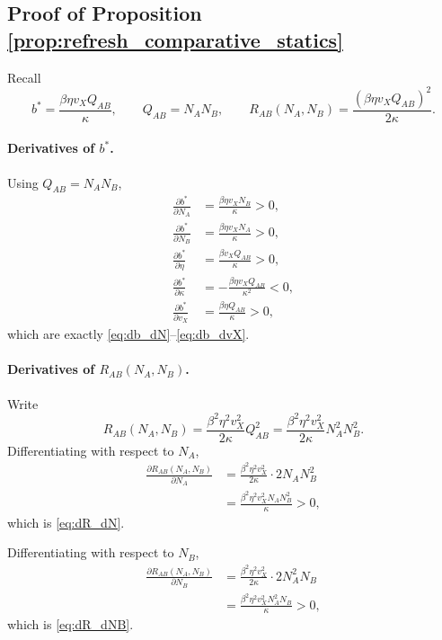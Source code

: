 \subsection{Proof of Proposition \ref{prop:refresh_comparative_statics}}

Recall
\[
b^*=\frac{\beta\eta v_XQ_{AB}}{\kappa},
\qquad
Q_{AB}=N_AN_B,
\qquad
R_{AB}(N_A,N_B)=\frac{(\beta\eta v_XQ_{AB})^2}{2\kappa}.
\]

\paragraph{Derivatives of $b^*$.}
Using $Q_{AB}=N_AN_B$,
\begin{align}
\frac{\partial b^*}{\partial N_A}
&=
\frac{\beta\eta v_XN_B}{\kappa}
>0,
\label{eq:app6_db_dNA}
\\[0.4em]
\frac{\partial b^*}{\partial N_B}
&=
\frac{\beta\eta v_XN_A}{\kappa}
>0,
\label{eq:app6_db_dNB}
\\[0.4em]
\frac{\partial b^*}{\partial \eta}
&=
\frac{\beta v_XQ_{AB}}{\kappa}
>0,
\label{eq:app6_db_deta}
\\[0.4em]
\frac{\partial b^*}{\partial \kappa}
&=
-\frac{\beta\eta v_XQ_{AB}}{\kappa^2}
<0,
\label{eq:app6_db_dkappa}
\\[0.4em]
\frac{\partial b^*}{\partial v_X}
&=
\frac{\beta\eta Q_{AB}}{\kappa}
>0,
\label{eq:app6_db_dvX}
\end{align}
which are exactly \eqref{eq:db_dN}--\eqref{eq:db_dvX}.

\paragraph{Derivatives of $R_{AB}(N_A,N_B)$.}
Write
\[
R_{AB}(N_A,N_B)
=
\frac{\beta^2\eta^2v_X^2}{2\kappa}Q_{AB}^2
=
\frac{\beta^2\eta^2v_X^2}{2\kappa}N_A^2N_B^2.
\]
Differentiating with respect to $N_A$,
\begin{align}
\frac{\partial R_{AB}(N_A,N_B)}{\partial N_A}
&=
\frac{\beta^2\eta^2v_X^2}{2\kappa}\cdot 2N_AN_B^2
\nonumber\\
&=
\frac{\beta^2\eta^2v_X^2N_AN_B^2}{\kappa}
>0,
\label{eq:app6_dR_dNA}
\end{align}
which is \eqref{eq:dR_dN}.

Differentiating with respect to $N_B$,
\begin{align}
\frac{\partial R_{AB}(N_A,N_B)}{\partial N_B}
&=
\frac{\beta^2\eta^2v_X^2}{2\kappa}\cdot 2N_A^2N_B
\nonumber\\
&=
\frac{\beta^2\eta^2v_X^2N_A^2N_B}{\kappa}
>0,
\label{eq:app6_dR_dNB}
\end{align}
which is \eqref{eq:dR_dNB}.

